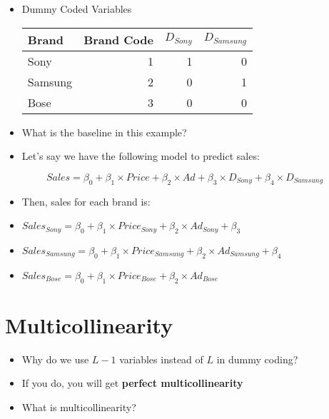 \documentclass[10pt,article]{article}
\begin{document}
\begin{itemize}
\item Dummy Coded Variables

\begin{center}
\begin{tabular}{lrrr}
Brand & Brand Code & \(D_{Sony}\) & \(D_{Samsung}\)\\
\hline
Sony & 1 & 1 & 0\\
Samsung & 2 & 0 & 1\\
Bose & 3 & 0 & 0\\
\end{tabular}
\end{center}

\item What is the baseline in this example?
\end{itemize}

\begin{itemize}
\item Let’s say we have the following model to predict sales:
\end{itemize}

\[  Sales = \beta_0 + \beta_1 \times Price + \beta_2 \times Ad + \beta_3 \times
D_{Sony}  + \beta_4 \times D_{Samsung} \]


\begin{itemize}
\item Then, sales for each brand is:
\end{itemize}

\begin{itemize}
\item \(Sales_{Sony} = \beta_0 + \beta_1 \times Price_{Sony} + \beta_2 \times Ad_{Sony} + \beta_3\)
\item \(Sales_{Samsung} = \beta_0 + \beta_1 \times Price_{Samsung} + \beta_2 \times Ad_{Samsung} + \beta_4\)
\item \(Sales_{Bose} = \beta_0 + \beta_1 \times Price_{Bose} + \beta_2 \times Ad_{Bose}\)
\end{itemize}
\section{Multicollinearity}
\label{sec:orga3be651}
\begin{itemize}
\item Why do we use \(L-1\) variables instead of \(L\) in dummy coding?

\item If you do, you will get \textbf{perfect multicollinearity}

\item What is multicollinearity?
\end{itemize}
\end{document}
